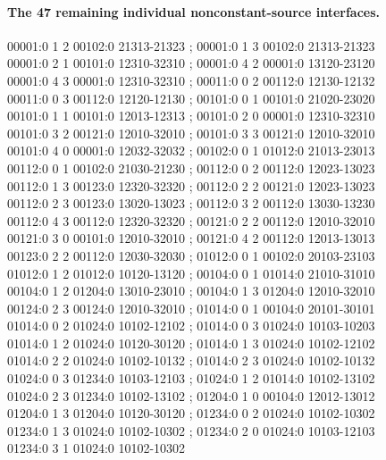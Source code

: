 \paragraph{The 47 remaining individual nonconstant-source interfaces.}
\begingroup\scriptsize\ttfamily\begin{flushleft}
00001:0 1 2 00102:0 21313-21323 ; 00001:0 1 3 00102:0 21313-21323\\
00001:0 2 1 00101:0 12310-32310 ; 00001:0 4 2 00001:0 13120-23120\\
00001:0 4 3 00001:0 12310-32310 ; 00011:0 0 2 00112:0 12130-12132\\
00011:0 0 3 00112:0 12120-12130 ; 00101:0 0 1 00101:0 21020-23020\\
00101:0 1 1 00101:0 12013-12313 ; 00101:0 2 0 00001:0 12310-32310\\
00101:0 3 2 00121:0 12010-32010 ; 00101:0 3 3 00121:0 12010-32010\\
00101:0 4 0 00001:0 12032-32032 ; 00102:0 0 1 01012:0 21013-23013\\
00112:0 0 1 00102:0 21030-21230 ; 00112:0 0 2 00112:0 12023-13023\\
00112:0 1 3 00123:0 12320-32320 ; 00112:0 2 2 00121:0 12023-13023\\
00112:0 2 3 00123:0 13020-13023 ; 00112:0 3 2 00112:0 13030-13230\\
00112:0 4 3 00112:0 12320-32320 ; 00121:0 2 2 00112:0 12010-32010\\
00121:0 3 0 00101:0 12010-32010 ; 00121:0 4 2 00112:0 12013-13013\\
00123:0 2 2 00112:0 12030-32030 ; 01012:0 0 1 00102:0 20103-23103\\
01012:0 1 2 01012:0 10120-13120 ; 00104:0 0 1 01014:0 21010-31010\\
00104:0 1 2 01204:0 13010-23010 ; 00104:0 1 3 01204:0 12010-32010\\
00124:0 2 3 00124:0 12010-32010 ; 01014:0 0 1 00104:0 20101-30101\\
01014:0 0 2 01024:0 10102-12102 ; 01014:0 0 3 01024:0 10103-10203\\
01014:0 1 2 01024:0 10120-30120 ; 01014:0 1 3 01024:0 10102-12102\\
01014:0 2 2 01024:0 10102-10132 ; 01014:0 2 3 01024:0 10102-10132\\
01024:0 0 3 01234:0 10103-12103 ; 01024:0 1 2 01014:0 10102-13102\\
01024:0 2 3 01234:0 10102-13102 ; 01204:0 1 0 00104:0 12012-13012\\
01204:0 1 3 01204:0 10120-30120 ; 01234:0 0 2 01024:0 10102-10302\\
01234:0 1 3 01024:0 10102-10302 ; 01234:0 2 0 01024:0 10103-12103\\
01234:0 3 1 01024:0 10102-10302\\
\end{flushleft}\endgroup

